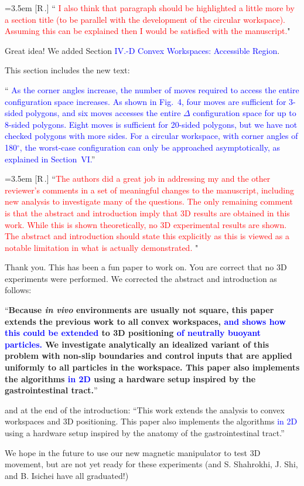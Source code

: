 \documentclass[conference, onecolumn, 10pt]{../IEEEtran}
\newcounter{reviewer}
\newcounter{point}[reviewer]
\newcommand{\revision}[1]{\textcolor{blue}{#1}}
\renewcommand{\thepoint}{[R\,\thereviewer.\arabic{point}] }
\newcommand{\response}[1]{\refstepcounter{point}  \smallbreak \noindent
	\hangindent=3.5em
	\hangafter=1
	\thepoint \space ``\textcolor{red}{#1}" \par\smallskip}
\begin{document}
	\response{ I also think that paragraph should be highlighted a little more by a section title (to be parallel with the development of the circular workspace).  Assuming this can be explained then I would be satisfied with the manuscript.}
	Great idea! We added Section 
	\revision{IV.-D Convex Workspaces: Accessible Region}.
	
	This section includes the new text:
	
	``\revision{
As the corner angles increase, the number of moves required to access the entire configuration space increases.  
As shown in Fig.~4,  four moves are sufficient for 3-sided polygons, and six moves accesses the entire $\Delta$ configuration space for up to 8-sided polygons.  Eight moves is sufficient for 20-sided polygons, but we have not checked polygons with more sides. For a circular workspace, with corner angles of 180$^\circ$, the worst-case configuration can only be approached asymptotically, as explained in Section~VI.}''

	
	
	\response{The authors did a great job in addressing my and the other reviewer's comments in a set of meaningful changes to the manuscript, including new analysis to investigate many of the questions. 
The only remaining comment is that the abstract and introduction imply that 3D results are obtained in this work. While this is shown theoretically, no 3D experimental results are shown. The abstract and introduction should state this explicitly as this is viewed as a notable limitation in what is actually demonstrated.
}
	Thank you. This has been a fun paper to work on. 
	 You are correct that no 3D experiments were performed.  
	 We corrected the abstract and introduction as follows:
	 
	``{\bf Because \emph{in vivo} environments are usually not square, this paper extends the previous work to all convex workspaces, \revision{ and shows how this could be extended} to 3D positioning \revision{of neutrally buoyant particles.} 
We investigate analytically an idealized variant of this problem with non-slip boundaries and control inputs that are applied uniformly to all particles in the workspace.
This paper also implements the algorithms \revision{in 2D} using a hardware setup inspired by the gastrointestinal tract.}''

and at the end of the introduction:
``This work extends the analysis to convex workspaces and 3D positioning. This paper also implements the algorithms \revision{in 2D} using a hardware setup inspired by the anatomy of the gastrointestinal tract.''

	 
	 We hope in the future to use our new magnetic manipulator to test 3D movement, but are not yet ready for these experiments (and S. Shahrokhi, J. Shi, and B. Isichei have all graduated!)
		
		
\end{document}
